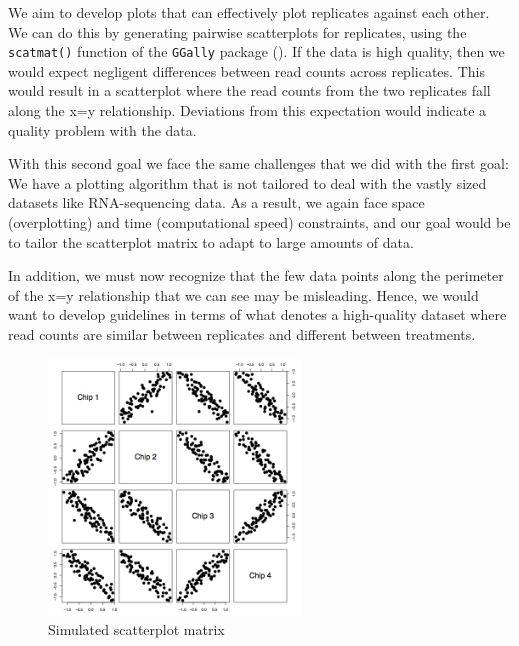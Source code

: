 \documentclass[11pt,a4paper,oldfontcommands,openany]{memoir}
\numberwithin{equation}{section} %
\newcommand{\code}[1]{{\texttt{#1}}}
\begin{document}
We aim to develop plots that can effectively plot replicates against each other. We can do this by generating pairwise scatterplots for replicates, using the \code{scatmat()} function of the \code{GGally} package (\citealt{ggally}). If the data is high quality, then we would expect negligent differences between read counts across replicates. This would result in a scatterplot where the read counts from the two replicates fall along the x=y relationship. Deviations from this expectation would indicate a quality problem with the data.

With this second goal we face the same challenges that we did with the first goal: We have a plotting algorithm that is not tailored to deal with the vastly sized datasets like RNA-sequencing data. As a result, we again face space (overplotting) and time (computational speed) constraints, and our goal would be to tailor the scatterplot matrix to adapt to large amounts of data.

In addition, we must now recognize that the few data points along the perimeter of the x=y relationship that we can see may be misleading. Hence, we would want to develop guidelines in terms of what denotes a high-quality dataset where read counts are similar between replicates and different between treatments. 

\begin{figure}[H]
    \centering
    \includegraphics[width=0.6\textwidth]{scatmat}
    \caption{Simulated scatterplot matrix}
    \label{fig:scatmat}
\end{figure}
\end{document}
